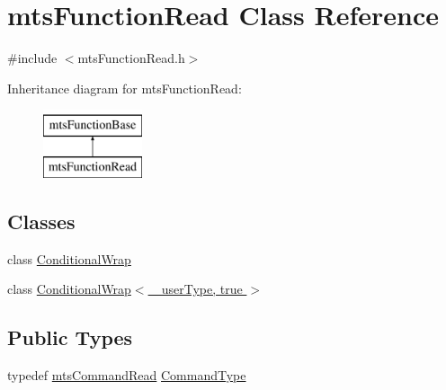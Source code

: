\hypertarget{classmts_function_read}{\section{mts\-Function\-Read Class Reference}
\label{classmts_function_read}
}


{\ttfamily \#include $<$mts\-Function\-Read.\-h$>$}

Inheritance diagram for mts\-Function\-Read\-:\begin{figure}[H]
\begin{center}
\leavevmode
\includegraphics[height=2.000000cm]{db/d23/classmts_function_read}
\end{center}
\end{figure}
\subsection*{Classes}
\begin{DoxyCompactItemize}
\item 
class \hyperlink{classmts_function_read_1_1_conditional_wrap}{Conditional\-Wrap}
\item 
class \hyperlink{classmts_function_read_1_1_conditional_wrap_3_01__user_type_00_01true_01_4}{Conditional\-Wrap$<$ \-\_\-user\-Type, true $>$}
\end{DoxyCompactItemize}
\subsection*{Public Types}
\begin{DoxyCompactItemize}
\item 
typedef \hyperlink{classmts_command_read}{mts\-Command\-Read} \hyperlink{classmts_function_read_ac29fb3db043f94da5d51fe37860b1015}{Command\-Type}
\end{DoxyCompactItemize}
